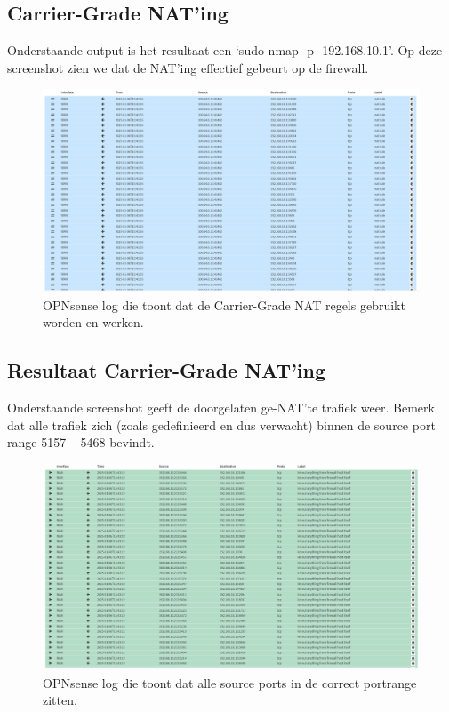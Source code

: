 \subsection{Carrier-Grade NAT’ing}
Onderstaande output is het resultaat een ‘sudo nmap -p- 192.168.10.1’. Op deze screenshot zien we dat de NAT’ing effectief gebeurt op de firewall.

\begin{figure}[H]
    \includegraphics[width=\textwidth]{graphics/nmap_nat_table.PNG}
    \caption[OPNsense CGN regels in werking deel 1]{OPNsense log die toont dat de Carrier-Grade NAT regels gebruikt worden en werken.}
    \label{fig:FirewallGCNWorksA}
\end{figure}

\subsection{Resultaat Carrier-Grade NAT’ing}
Onderstaande screenshot geeft de doorgelaten ge-NAT’te trafiek weer. Bemerk dat alle trafiek zich (zoals gedefinieerd en dus verwacht) binnen de source port range 5157 – 5468 bevindt.

\begin{figure}[H]
    \includegraphics[width=\textwidth]{graphics/nmap_firewall_table.PNG}
    \caption[OPNsense CGN regels in werking deel 2]{OPNsense log die toont dat alle source ports in de correct portrange zitten.}
    \label{fig:FirewallGCNWorksB}
\end{figure}

